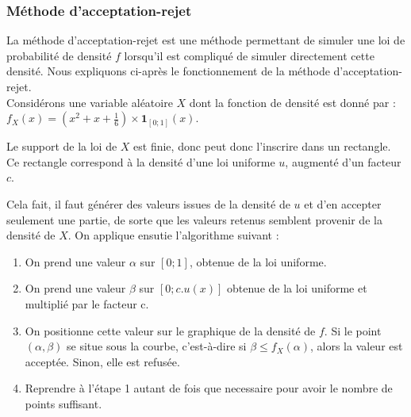 \documentclass{article}
\begin{document}
\subsubsection*{Méthode d'acceptation-rejet}
La méthode d'acceptation-rejet est une méthode permettant de simuler une loi de probabilité de densité $f$ lorsqu'il est compliqué de simuler directement cette densité. Nous expliquons ci-après le fonctionnement de la méthode d'acceptation-rejet.\\
Considérons une variable aléatoire $X$ dont la fonction de densité est donné par : $f_X(x) = (x^2 + x + \frac{1}{6}) \times \mathbf{1}_{[0;1]}(x)$.
\begin{center}
\end{center}
Le support de la loi de $X$ est finie, donc peut donc l'inscrire dans un rectangle. Ce rectangle correspond à la densité d'une loi uniforme $u$, augmenté d'un facteur $c$.
\begin{center}
\end{center}
Cela fait, il faut générer des valeurs issues de la densité de $u$ et d'en accepter seulement une partie, de sorte que les valeurs retenus semblent provenir de la densité de $X$. On applique ensutie l'algorithme suivant :
\begin{enumerate}
\item On prend une valeur $\alpha$ sur $[0;1]$, obtenue de la loi uniforme.
\item On prend une valeur $\beta$ sur $[0;c.u(x)]$ obtenue de la loi uniforme et multiplié par le facteur c.
\item On positionne cette valeur sur le graphique de la densité de $f$. Si le point $(\alpha, \beta)$ se situe sous la courbe, c'est-à-dire si $\beta \leq f_X(\alpha)$, alors la valeur est acceptée. Sinon, elle est refusée.
\item Reprendre à l'étape 1 autant de fois que necessaire pour avoir le nombre de points suffisant.
\end{enumerate}
\end{document}
